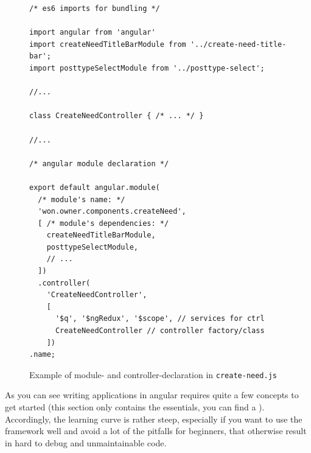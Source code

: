\begin{figure}
\centering
\begin{verbatim}
/* es6 imports for bundling */

import angular from 'angular'
import createNeedTitleBarModule from '../create-need-title-bar';
import posttypeSelectModule from '../posttype-select';

//...

class CreateNeedController { /* ... */ }

//...

/* angular module declaration */

export default angular.module(
  /* module's name: */
  'won.owner.components.createNeed', 
  [ /* module's dependencies: */
    createNeedTitleBarModule,
    posttypeSelectModule,
    // ...
  ])
  .controller(
    'CreateNeedController', 
    [
      '$q', '$ngRedux', '$scope', // services for ctrl
      CreateNeedController // controller factory/class
    ])
.name;
\end{verbatim}
\caption{Example of module- and controller-declaration in \texttt{create-need.js}}
\label{fig:ng-duplicate-dependencies}
\end{figure}

As you can see writing applications in angular requires quite a few concepts to get started (this section only contains the essentials, you can find a ). Accordingly, the learning curve is rather steep, especially if you want to use the framework well and avoid a lot of the pitfalls for beginners, that otherwise result in hard to debug and unmaintainable code.


